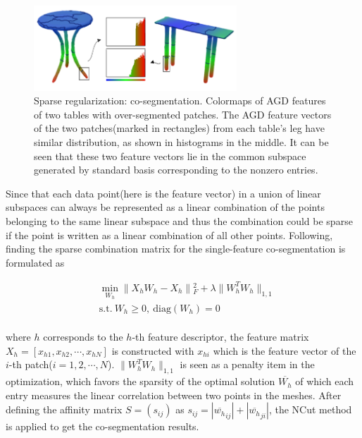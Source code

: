\begin{figure}[ht]
  \centering
  \includegraphics[width=3in]{images/co-segmentationAGD}
  \caption{Sparse regularization: co-segmentation\cite{hu2012co}. Colormaps of AGD features of two tables with over-segmented patches. The AGD feature vectors of the two patches(marked in rectangles) from each table's leg have similar distribution, as shown in histograms in the middle. It can be seen that these two feature vectors lie in the common subspace generated by standard basis corresponding to the nonzero entries.}
  \label{fig:co-segmentationAGD}
\end{figure}


Since that each data point(here is the feature vector) in a union of linear subspaces can always be represented as a linear combination of the points belonging to the same linear subspace
and thus the combination could be sparse if the point is written as a linear combination of all other points. Following\cite{elhamifar2009sparse,wang2011efficient}, finding the sparse combination matrix for the single-feature co-segmentation is formulated as

\small{
\begin{equation}
 \label{eq:SSC}
 \begin{split}
 &\min_{W_{h}}\|X_{h}W_{h}-X_{h}\|{_{F}^2}+\lambda\|W_{h}^{T}W_{h}\|_{1,1} \\
 &\mathrm{s.t.}~W_{h}\ge0,~\textrm{diag}(W_{h})=0
 \end{split}
\end{equation}
}
\\
where $h$ corresponds to the $h$-th feature descriptor,
the feature matrix $X_{h}=[x_{h1},x_{h2},\cdots,x_{hN}]$ is constructed with $x_{hi}$ which is the feature vector of the $i$-th patch($i=1,2,\cdots,N$).
$\|W_{h}^{T}W_{h}\|_{1,1}$ is seen as a penalty item in the optimization, which favors the sparsity of the optimal solution $\overline{W_{h}}$ of which each entry measures the linear correlation between two points in the meshes.
After defining the affinity matrix $S=(s_{ij})$ as $s_{ij}=|\overline{w_{h}}_{ij}|+|\overline{w_{h}}_{ji}|$, the NCut method\cite{shi2000normalized} is applied to get the co-segmentation results.


